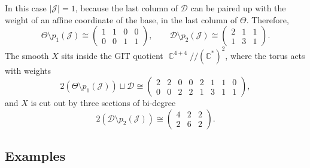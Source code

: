 \documentclass[12pt,a4paper,oneside]{amsart}
\numberwithin{equation}{section}
\theoremstyle{definition}
\theoremstyle{remark}
\DeclareMathOperator{\C}{\mathbb{C}}
\begin{document}
\begin{itemize}
\begin{equation*}
\end{equation*}
In this case $\lvert \mathscr{J}\rvert =1$, because the last column of $\mathcal{D}$ can be paired up with the weight of an affine coordinate of the base, in the last column of $\Theta$. Therefore, 
\begin{equation*}
    \Theta \setminus p_1 (\mathscr{J}) \cong  \left( \begin{matrix} 1 & 1 & 0 &0 \\ 0 & 0 & 1 & 1 \end{matrix} \right) , \qquad \mathcal{D} \setminus p_2 (\mathscr{J}) \cong  \left( \begin{matrix} 2 & 1 & 1  \\ 1 & 3 & 1  \end{matrix} \right) .
\end{equation*}
The smooth $X$ sits inside the GIT quotient $\C^{4+4} /\!\!/ (\mathbb{C}^{*})^2$, where the torus acts with weights 
\begin{equation*}
    2 \left( \Theta \setminus p_1 (\mathscr{J}) \right) \sqcup \mathcal{D}  \cong \left( \begin{matrix} 2 & 2 & 0 & 0 & 2 & 1 & 1 & 0 \\ 0 & 0 & 2 & 2 & 1 & 3 & 1 & 1 \end{matrix} \right) ,
\end{equation*}
and $X$ is cut out by three sections of bi-degree
\begin{equation*}
   2 \left(  \mathcal{D} \setminus p_2 (\mathscr{J}) \right) \cong  \left( \begin{matrix} 4 & 2 & 2 \\ 2 & 6 & 2 \end{matrix} \right) .
\end{equation*}
\end{itemize} 




\subsection{Examples}
\label{sec:GLSMEx}
\end{document}
